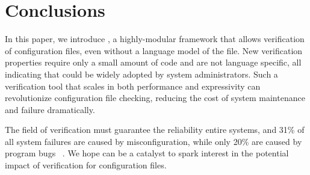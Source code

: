 
\section{Conclusions}

In this paper, we introduce \app, a highly-modular framework that allows verification of configuration files, even without a language model of the file.
New verification properties require only a small amount of code and are not language specific, all indicating that \app could be widely adopted by system administrators.
Such a verification tool that scales in both performance and expressivity can revolutionize configuration file checking, reducing the cost of system maintenance and failure dramatically.

The field of verification must guarantee the reliability entire systems, and 31\% of all system failures are caused by misconfiguration, while only 20\% are caused by program bugs ~\cite{xu13do}. We hope \app can be  a catalyst to spark interest in the potential impact of verification for configuration files.

